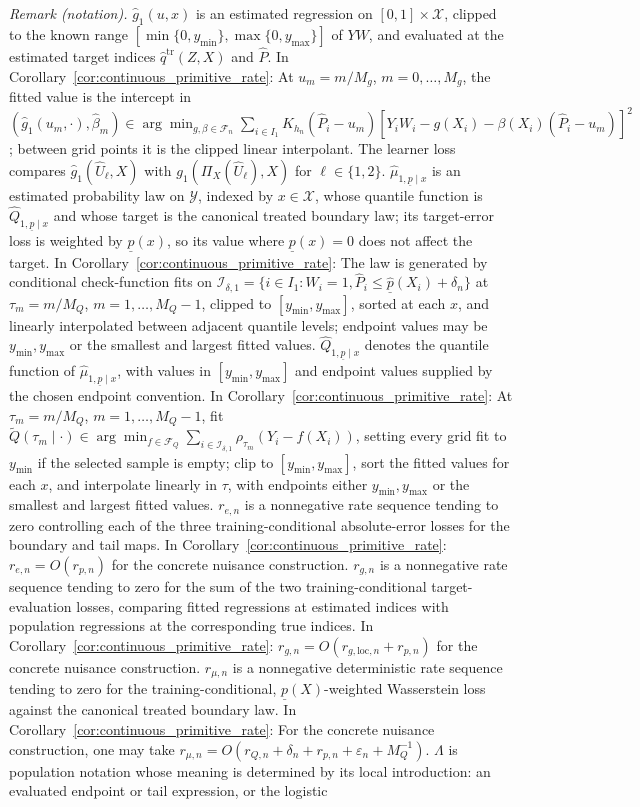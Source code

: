 \noindent\textit{Remark (notation).} $\hat g_1(u,x)$ is an estimated regression on $[0,1]\times\mathcal X$, clipped to the known range $[\min\{0,y_{\min}\},\max\{0,y_{\max}\}]$ of $YW$, and evaluated at the estimated target indices $\hat q^{\mathrm{tr}}(Z,X)$ and $\hat P$. In Corollary~\ref{cor:continuous_primitive_rate}: At $u_m=m/M_g$, $m=0,\ldots,M_g$, the fitted value is the intercept in $(\hat g_1(u_m,\cdot),\hat\beta_m)\in\arg\min_{g,\beta\in\mathcal F_n}\sum_{i\in I_1}K_{h_n}(\hat P_i-u_m)[Y_iW_i-g(X_i)-\beta(X_i)(\hat P_i-u_m)]^2$; between grid points it is the clipped linear interpolant. The learner loss compares $\hat g_1(\hat U_\ell,X)$ with $g_1(\Pi_X(\hat U_\ell),X)$ for $\ell\in\{1,2\}$. $\hat\mu_{1,\underline p\mid x}$ is an estimated probability law on $\mathcal Y$, indexed by $x\in\mathcal X$, whose quantile function is $\widehat Q_{1,\underline p\mid x}$ and whose target is the canonical treated boundary law; its target-error loss is weighted by $\underline p(x)$, so its value where $\underline p(x)=0$ does not affect the target. In Corollary~\ref{cor:continuous_primitive_rate}: The law is generated by conditional check-function fits on $\mathcal I_{\delta,1}=\{i\in I_1:W_i=1,\hat P_i\leqslant\hat{\underline p}(X_i)+\delta_n\}$ at $\tau_m=m/M_Q$, $m=1,\ldots,M_Q-1$, clipped to $[y_{\min},y_{\max}]$, sorted at each $x$, and linearly interpolated between adjacent quantile levels; endpoint values may be $y_{\min},y_{\max}$ or the smallest and largest fitted values. $\widehat Q_{1,\underline p\mid x}$ denotes the quantile function of $\hat\mu_{1,\underline p\mid x}$, with values in $[y_{\min},y_{\max}]$ and endpoint values supplied by the chosen endpoint convention. In Corollary~\ref{cor:continuous_primitive_rate}: At $\tau_m=m/M_Q$, $m=1,\ldots,M_Q-1$, fit $\widetilde Q(\tau_m\mid\cdot)\in\arg\min_{f\in\mathcal F_Q}\sum_{i\in\mathcal I_{\delta,1}}\rho_{\tau_m}(Y_i-f(X_i))$, setting every grid fit to $y_{\min}$ if the selected sample is empty; clip to $[y_{\min},y_{\max}]$, sort the fitted values for each $x$, and interpolate linearly in $\tau$, with endpoints either $y_{\min},y_{\max}$ or the smallest and largest fitted values. $r_{e,n}$ is a nonnegative rate sequence tending to zero controlling each of the three training-conditional absolute-error losses for the boundary and tail maps. In Corollary~\ref{cor:continuous_primitive_rate}: $r_{e,n}=O(r_{p,n})$ for the concrete nuisance construction. $r_{g,n}$ is a nonnegative rate sequence tending to zero for the sum of the two training-conditional target-evaluation losses, comparing fitted regressions at estimated indices with population regressions at the corresponding true indices. In Corollary~\ref{cor:continuous_primitive_rate}: $r_{g,n}=O(r_{g,\mathrm{loc},n}+r_{p,n})$ for the concrete nuisance construction. $r_{\mu,n}$ is a nonnegative deterministic rate sequence tending to zero for the training-conditional, $\underline p(X)$-weighted Wasserstein loss against the canonical treated boundary law. In Corollary~\ref{cor:continuous_primitive_rate}: For the concrete nuisance construction, one may take $r_{\mu,n}=O(r_{Q,n}+\delta_n+r_{p,n}+\varepsilon_n+M_Q^{-1})$. $\Lambda$ is population notation whose meaning is determined by its local introduction: an evaluated endpoint or tail expression, or the logistic 